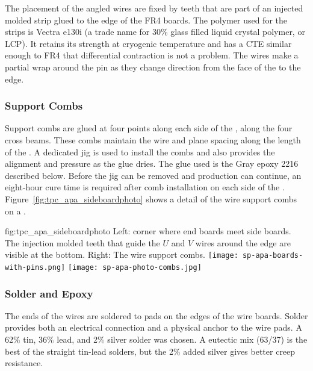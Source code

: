 The placement of the angled wires are fixed by teeth that are part of an injected molded strip glued to the edge of the FR4 boards.  The polymer used for the strips is Vectra e130i (a trade name for 30$\%$ glass filled liquid crystal polymer, or LCP). It retains its strength at cryogenic temperature and has a CTE similar enough to FR4 that differential contraction is not a problem.  The wires make a partial wrap around the pin as they change direction from the face of the  to the edge.

\subsubsection{Support Combs}
\label{sec:combs}

Support combs are glued at four points along each side of the , along the four cross beams. These combs maintain the wire and plane spacing along the length of the . A dedicated jig is used to install the combs and also provides the alignment and pressure as the glue dries. The glue used is the Gray epoxy \num{2216} described below. Before the jig can be removed and production can continue, an eight-hour cure time is required after comb installation on each side of the .  Figure~\ref{fig:tpc_apa_sideboardphoto} shows a detail of the wire support combs on a  .

\begin{dunefigure}{fig:tpc_apa_sideboardphoto}
{Left:  corner where end boards meet side boards.  The injection molded teeth that guide the $U$ and $V$ wires around the edge are visible at the bottom. Right: The wire support combs.}
\texttt{[image: sp-apa-boards-with-pins.png]} \quad
\texttt{[image: sp-apa-photo-combs.jpg]}
\end{dunefigure}

\subsubsection{Solder and Epoxy}
\label{sec:glue-solder}

The ends of the wires are soldered to pads on the edges of the wire boards.  Solder provides both an electrical connection and a physical anchor to the wire pads. A 62$\%$ tin, 36$\%$ lead, and 2$\%$ silver solder was chosen.  A eutectic mix (63/37) is the best of the straight tin-lead 
 solders, but the 2$\%$ added silver gives better creep resistance. 

